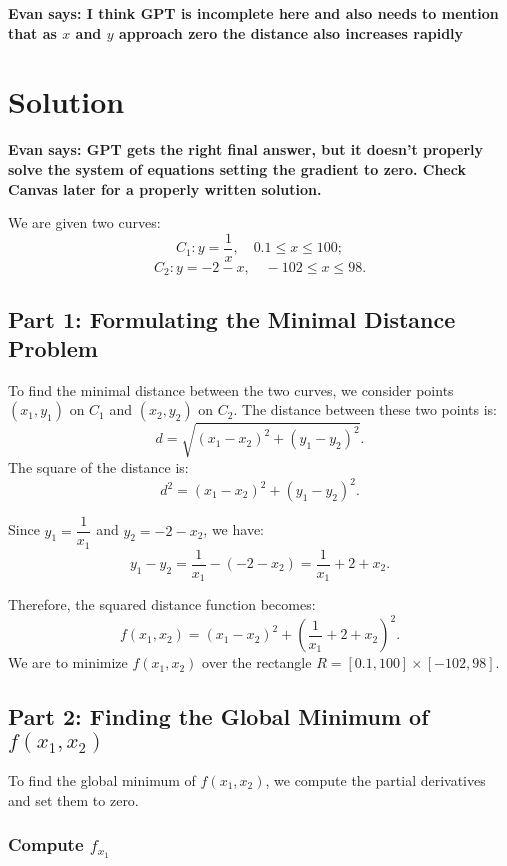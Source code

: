 \documentclass[11pt]{article}
\begin{document}
\textbf{Evan says: I think GPT is incomplete here and also needs to mention that as $x$ and $y$ approach zero the distance also increases rapidly}



\newpage

\section{Solution}
\textbf{Evan says: GPT gets the right final answer,
but it doesn't properly solve the system of equations setting the gradient to zero.
Check Canvas later for a properly written solution.}

We are given two curves:
\[
C_1: y = \frac{1}{x}, \quad 0.1 \leq x \leq 100;
\]
\[
C_2: y = -2 - x, \quad -102 \leq x \leq 98.
\]

\subsection{Part 1: Formulating the Minimal Distance Problem}

To find the minimal distance between the two curves, we consider points \( (x_1, y_1) \) on \( C_1 \) and \( (x_2, y_2) \) on \( C_2 \). The distance between these two points is:
\[
d = \sqrt{(x_1 - x_2)^2 + (y_1 - y_2)^2}.
\]
The square of the distance is:
\[
d^2 = (x_1 - x_2)^2 + (y_1 - y_2)^2.
\]

Since \( y_1 = \dfrac{1}{x_1} \) and \( y_2 = -2 - x_2 \), we have:
\[
y_1 - y_2 = \frac{1}{x_1} - (-2 - x_2) = \frac{1}{x_1} + 2 + x_2.
\]

Therefore, the squared distance function becomes:
\[
f(x_1, x_2) = (x_1 - x_2)^2 + \left( \frac{1}{x_1} + 2 + x_2 \right)^2.
\]
We are to minimize \( f(x_1, x_2) \) over the rectangle \( R = [0.1, 100] \times [-102, 98] \).

\newpage

\subsection{Part 2: Finding the Global Minimum of \( f(x_1, x_2) \)}

To find the global minimum of \( f(x_1, x_2) \), we compute the partial derivatives and set them to zero.

\newpage

\subsubsection{Compute \( f_{x_1} \)}
\end{document}
